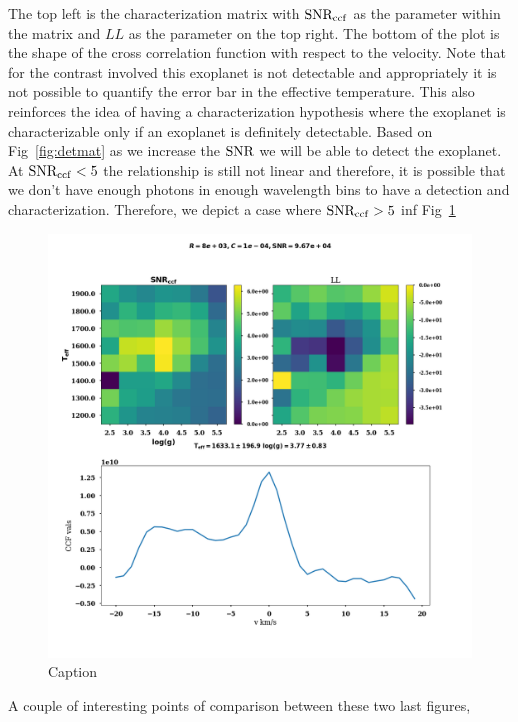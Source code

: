 The top left is the characterization matrix with $\rm{SNR_{ccf}}$ as the parameter within the matrix and $LL$ as the parameter on the top right.
The bottom of the plot is the shape of the cross correlation function with respect to the velocity.
Note that for the contrast involved this exoplanet is not detectable and appropriately it is not possible to quantify the error bar in the effective temperature.
This also reinforces the idea of having a characterization hypothesis where the exoplanet is characterizable only if an exoplanet is definitely detectable.
Based on Fig~\ref{fig:detmat} as we increase the $\rm{SNR}$ we will be able to detect the exoplanet. 
At $\rm{SNR_{ccf}}<5$ the relationship is still not linear and therefore, it is possible that we don't have enough photons in enough wavelength bins to have a detection and characterization. 
Therefore, we depict a case where $\rm{SNR_{ccf}}>5$ inf Fig~\ref{fig:charmap-det}
\begin{figure}[!h]
    \centering
    \includegraphics[scale=0.4]{images/Chapter3/char_plots_8e+03_1e-04_9.67e+04.png}
    \caption{Caption}
    \label{fig:charmap-det}
\end{figure}
A couple of interesting points of comparison between these two last figures,
